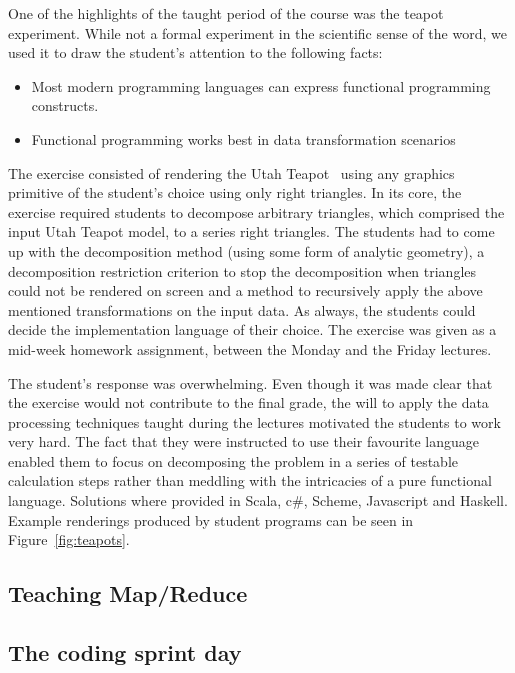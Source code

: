 \documentclass[conference]{IEEEtran}
\begin{document}
One of the highlights of the taught period of the course was the teapot
experiment. While not a formal experiment in the scientific sense of the word,
we used it to draw the student's attention to the following facts:

\begin{itemize}

  \item Most modern programming languages can express functional programming
    constructs.

  \item Functional programming works best in data transformation scenarios

\end{itemize}

The exercise consisted of rendering the Utah Teapot~\cite{Torre06} using any
graphics primitive of the student's choice using only right triangles.  In its
core, the exercise required students to decompose arbitrary triangles, which
comprised the input Utah Teapot model, to a series right triangles. The students
had to come up with the decomposition method (using some form of analytic
geometry), a decomposition restriction criterion to stop the decomposition when
triangles could not be rendered on screen and a method to recursively apply the
above mentioned transformations on the input data. As always, the students could
decide the implementation language of their choice. The exercise was given as a
mid-week homework assignment, between the Monday and the Friday lectures.

The student's response was overwhelming. Even though it was made clear that
the exercise would not contribute to the final grade, the will to apply the
data processing techniques taught during the lectures motivated
the students to work very hard. The fact that they were instructed to use
their favourite language enabled them to focus on decomposing the problem 
in a series of testable calculation steps rather than meddling with the
intricacies of a pure functional language. Solutions where provided in
Scala, {\sc c\#}, Scheme, Javascript and Haskell. 
Example renderings produced by student programs can be seen in 
Figure~\ref{fig:teapots}.

\subsection{Teaching Map/Reduce}

 

\subsection{The coding sprint day}
\end{document}
